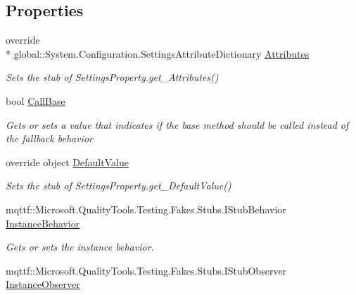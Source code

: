 \subsection*{Properties}
\begin{DoxyCompactItemize}
\item 
override \\*
global\-::\-System.\-Configuration.\-Settings\-Attribute\-Dictionary \hyperlink{class_system_1_1_configuration_1_1_fakes_1_1_stub_settings_property_a3172977164e9fe8bd1ab33c062bc728a}{Attributes}
\begin{DoxyCompactList}\small\item\em Sets the stub of Settings\-Property.\-get\-\_\-\-Attributes()\end{DoxyCompactList}\item 
bool \hyperlink{class_system_1_1_configuration_1_1_fakes_1_1_stub_settings_property_a335f2129e0ba72159254b823cd622417}{Call\-Base}
\begin{DoxyCompactList}\small\item\em Gets or sets a value that indicates if the base method should be called instead of the fallback behavior\end{DoxyCompactList}\item 
override object \hyperlink{class_system_1_1_configuration_1_1_fakes_1_1_stub_settings_property_a388540d1a766cb0ae903565134031373}{Default\-Value}
\begin{DoxyCompactList}\small\item\em Sets the stub of Settings\-Property.\-get\-\_\-\-Default\-Value()\end{DoxyCompactList}\item 
mqttf\-::\-Microsoft.\-Quality\-Tools.\-Testing.\-Fakes.\-Stubs.\-I\-Stub\-Behavior \hyperlink{class_system_1_1_configuration_1_1_fakes_1_1_stub_settings_property_ac774dd987621a61b559ce8be01d2b9fe}{Instance\-Behavior}
\begin{DoxyCompactList}\small\item\em Gets or sets the instance behavior.\end{DoxyCompactList}\item 
mqttf\-::\-Microsoft.\-Quality\-Tools.\-Testing.\-Fakes.\-Stubs.\-I\-Stub\-Observer \hyperlink{class_system_1_1_configuration_1_1_fakes_1_1_stub_settings_property_a58f9a3200e8bf6bdc33f313c5a1d5846}{Instance\-Observer}

\end{DoxyCompactItemize}
